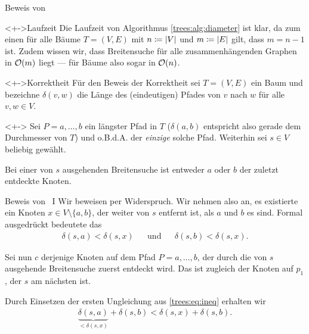 \begin{frame}{Beweis von }
\begin{block}<+->{Laufzeit}
Die Laufzeit von Algorithmus \ref{trees:alg:diameter} ist klar, da zum einen f\"ur alle B\"aume $T = (V, E)$ mit $n \coloneqq \vert V\vert$ und $m \coloneqq \vert E\vert$ gilt, dass $m = n - 1$ ist.
Zudem wissen wir, dass Breitensuche f\"ur alle zusammenh\"angenden Graphen in $\mathcal{O}(m)$ liegt --- f\"ur B\"aume also sogar in $\mathcal{O}(n)$.
\end{block}

\begin{block}<+->{Korrektheit}
F\"ur den Beweis der Korrektheit sei $T = (V, E)$ ein Baum und bezeichne $\delta(v, w)$ die L\"ange des (eindeutigen) Pfades von $v$ nach $w$ f\"ur alle $v, w \in V$.

\begin{lemma}<+->
\label{trees:lem:dist}
\vspace*{-7pt}
Sei $P = a, \dots, b$ ein l\"angster Pfad in $T$ ($\delta(a, b)$ entspricht also gerade dem Durchmesser von $T$) und o.B.d.A. der \emph{einzige} solche Pfad.
Weiterhin sei $s \in V$ beliebig gew\"ahlt.

Bei einer von $s$ ausgehenden Breitensuche ist entweder $a$ oder $b$ der zuletzt entdeckte Knoten.
\end{lemma}
\end{block}
\end{frame}

\begin{frame}{Beweis von  \, I}
Wir beweisen per Widerspruch.
Wir nehmen also an, es existierte ein Knoten $x \in V \setminus \{ a, b \}$, der weiter von $s$ entfernt ist, als $a$ und $b$ es sind.
Formal ausgedr\"uckt bedeutete das
\begin{align}\label{trees:eq:ineq}
    \delta(s, a) < \delta(s, x) && \text{und} && \delta(s, b) < \delta(s, x).
\end{align}

Sei nun $c$ derjenige Knoten auf dem Pfad $P = a, \dots, b$, der durch die von $s$ ausgehende Breitensuche zuerst entdeckt wird.
Das ist zugleich der Knoten auf $p_1$, der $s$ am n\"achsten ist.

Durch Einsetzen der ersten Ungleichung aus \eqref{trees:eq:ineq} erhalten wir
\begin{align}\label{trees:eq:f1}
    \underbrace{\delta(s, a)}_{< \delta(s, x)} + \delta(s, b) < \delta(s, x) + \delta(s, b).
\end{align}
\end{frame}

